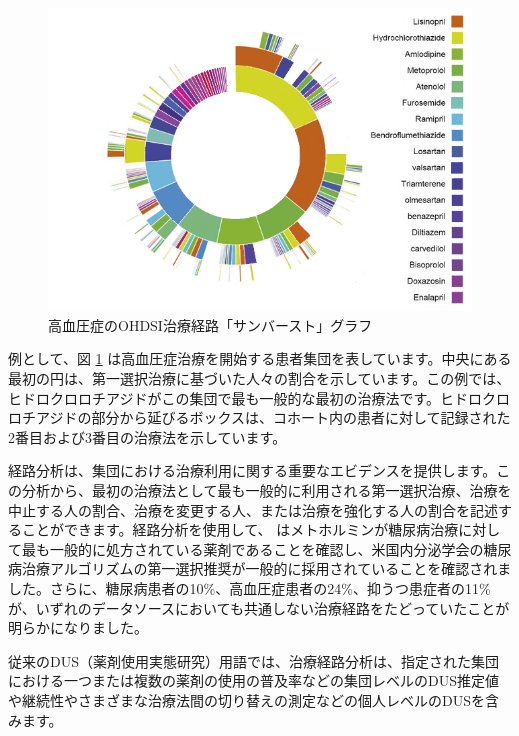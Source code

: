 \documentclass[
  11pt]{book}
\theoremstyle{definition}
\theoremstyle{definition}
\theoremstyle{definition}
\theoremstyle{definition}
\theoremstyle{remark}
\begin{document}
\begin{figure}

{\centering \includegraphics[width=1\linewidth]{images/Characterization/pnasTreatmentPathwaysSunburst} 

}

\caption{高血圧症のOHDSI治療経路「サンバースト」グラフ}\label{fig:treatmentPathwaysSunburstDataViz}
\end{figure}

例として、図 \ref{fig:treatmentPathwaysSunburstDataViz} は高血圧症治療を開始する患者集団を表しています。中央にある最初の円は、第一選択治療に基づいた人々の割合を示しています。この例では、ヒドロクロロチアジドがこの集団で最も一般的な最初の治療法です。ヒドロクロロチアジドの部分から延びるボックスは、コホート内の患者に対して記録された2番目および3番目の治療法を示しています。

経路分析は、集団における治療利用に関する重要なエビデンスを提供します。この分析から、最初の治療法として最も一般的に利用される第一選択治療、治療を中止する人の割合、治療を変更する人、または治療を強化する人の割合を記述することができます。経路分析を使用して、\citet{Hripcsak7329} はメトホルミンが糖尿病治療に対して最も一般的に処方されている薬剤であることを確認し、米国内分泌学会の糖尿病治療アルゴリズムの第一選択推奨が一般的に採用されていることを確認されました。さらに、糖尿病患者の10\%、高血圧症患者の24\%、抑うつ患症者の11\%が、いずれのデータソースにおいても共通しない治療経路をたどっていたことが明らかになりました。

従来のDUS（薬剤使用実態研究）用語では、治療経路分析は、指定された集団における一つまたは複数の薬剤の使用の普及率などの集団レベルのDUS推定値や継続性やさまざまな治療法間の切り替えの測定などの個人レベルのDUSを含みます。
\end{document}
